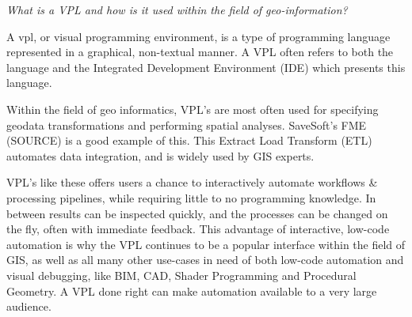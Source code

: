 \emph{What is a VPL and how is it used within the field of geo-information?}

A \ac{vpl}, or visual programming environment, is a type of programming language represented in a graphical, non-textual manner.
A VPL often refers to both the language and the Integrated Development Environment (IDE) which presents this language.


Within the field of geo informatics, VPL's are most often used for specifying geodata transformations and performing spatial analyses.  
SaveSoft's FME (SOURCE) is a good example of this. This Extract Load Transform (ETL) automates data integration, and is widely used by GIS experts. 




VPL's like these offers users a chance to interactively automate workflows \& processing pipelines, while requiring little to no programming knowledge. 
In between results can be inspected quickly, and the processes can be changed on the fly, often with immediate feedback.
This advantage of interactive, low-code automation is why the VPL continues to be a popular interface within the field of GIS, as well as all many other use-cases in need of both low-code automation and visual debugging, like BIM, CAD, Shader Programming and Procedural Geometry. 
A VPL done right can make automation available to a very large audience. 





